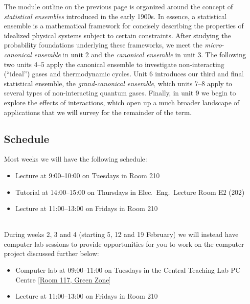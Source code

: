 The module outline on the previous page is organized around the concept of \textit{statistical ensembles} introduced in the early 1900s.
In essence, a statistical ensemble is a mathematical framework for concisely describing the properties of idealized physical systems subject to certain constraints.
After studying the probability foundations underlying these frameworks, we meet the \textit{micro-canonical ensemble} in unit 2 and the \textit{canonical ensemble} in unit 3.
The following two units 4--5 apply the canonical ensemble to investigate non-interacting (``ideal'') gases and thermodynamic cycles.
Unit 6 introduces our third and final statistical ensemble, the \textit{grand-canonical ensemble}, which units 7--8 apply to several types of non-interacting quantum gases.
Finally, in unit 9 we begin to explore the effects of interactions, which open up a much broader landscape of applications that we will survey for the remainder of the term.



\subsection*{Schedule}
Most weeks we will have the following schedule: \\[-30 pt]
\begin{itemize}
  \setlength{\itemsep}{1pt}
  \setlength{\parskip}{0pt}
  \setlength{\parsep}{0pt}
  \item Lecture at 9:00--10:00 on Tuesdays in Room 210
  \item Tutorial at 14:00–15:00 on Thursdays in Elec.~Eng.~Lecture Room E2 (202)
  \item Lecture at 11:00--13:00 on Fridays in Room 210
\end{itemize}
\ \\[-30 pt]
During weeks 2, 3 and 4 (starting 5, 12 and 19 February) we will instead have computer lab sessions to provide opportunities for you to work on the computer project discussed further below: \\[-30 pt]
\begin{itemize}
  \setlength{\itemsep}{1pt}
  \setlength{\parskip}{0pt}
  \setlength{\parsep}{0pt}
  \item Computer lab at 09:00--11:00 on Tuesdays in the Central Teaching Lab PC Centre [\href{https://www.liverpool.ac.uk/intranet/timetabling/online-room-catalogue/rooms/ctl-pctc-green.html}{Room 117, Green Zone}]
  \item Lecture at 11:00--13:00 on Fridays in Room 210
\end{itemize}

